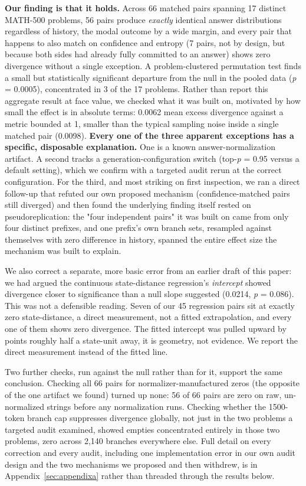 \documentclass{article}
\begin{document}
\textbf{Our finding is that it holds.} Across 66 matched pairs spanning 17 distinct MATH-500 problems, 56 pairs produce \emph{exactly} identical answer distributions regardless of history, the modal outcome by a wide margin, and every pair that happens to also match on confidence and entropy (7 pairs, not by design, but because both sides had already fully committed to an answer) shows zero divergence without a single exception. A problem-clustered permutation test finds a small but statistically significant departure from the null in the pooled data (\emph{p} = 0.0005), concentrated in 3 of the 17 problems. Rather than report this aggregate result at face value, we checked what it was built on, motivated by how small the effect is in absolute terms: 0.0062 mean excess divergence against a metric bounded at 1, smaller than the typical sampling noise inside a single matched pair (0.0098). \textbf{Every one of the three apparent exceptions has a specific, disposable explanation.} One is a known answer-normalization artifact. A second tracks a generation-configuration switch (top-\emph{p} = 0.95 versus a default setting), which we confirm with a targeted audit rerun at the correct configuration. For the third, and most striking on first inspection, we ran a direct follow-up that refuted our own proposed mechanism (confidence-matched pairs still diverged) and then found the underlying finding itself rested on pseudoreplication: the "four independent pairs" it was built on came from only four distinct prefixes, and one prefix's own branch sets, resampled against themselves with zero difference in history, spanned the entire effect size the mechanism was built to explain.

We also correct a separate, more basic error from an earlier draft of this paper: we had argued the continuous state-distance regression's \emph{intercept} showed divergence closer to significance than a null slope suggested (0.0214, \emph{p} = 0.086). This was not a defensible reading. Seven of our 45 regression pairs sit at exactly zero state-distance, a direct measurement, not a fitted extrapolation, and every one of them shows zero divergence. The fitted intercept was pulled upward by points roughly half a state-unit away, it is geometry, not evidence. We report the direct measurement instead of the fitted line.

Two further checks, run against the null rather than for it, support the same conclusion. Checking all 66 pairs for normalizer-manufactured zeros (the opposite of the one artifact we found) turned up none: 56 of 66 pairs are zero on raw, un-normalized strings before any normalization runs. Checking whether the 1500-token branch cap suppresses divergence globally, not just in the two problems a targeted audit examined, showed empties concentrated entirely in those two problems, zero across 2,140 branches everywhere else. Full detail on every correction and every audit, including one implementation error in our own audit design and the two mechanisms we proposed and then withdrew, is in Appendix~\ref{sec:appendixa} rather than threaded through the results below.
\end{document}
